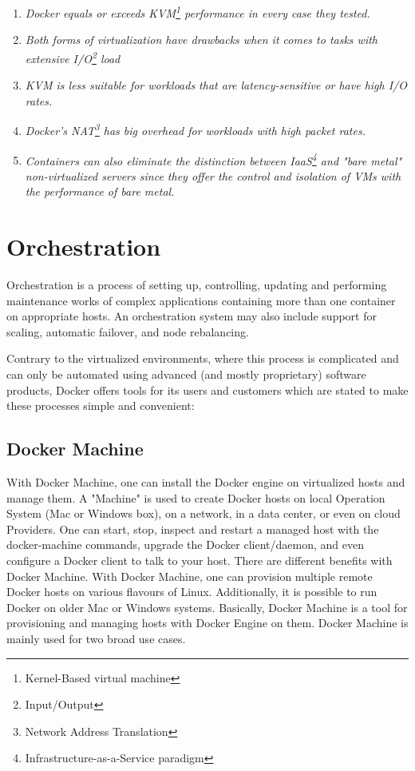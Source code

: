 \begin{enumerate}
\item \textit{Docker equals or
exceeds KVM\footnote{Kernel-Based virtual machine}
performance in every case they tested.}
\item \textit{Both forms of virtualization have drawbacks
when it comes to tasks with
extensive I/O\footnote{Input/Output} load}
\item \textit{KVM is less suitable for workloads that are latency-sensitive
or have high I/O rates.}
\item \textit{Docker's NAT\footnote{Network Address Translation}
has big overhead
for workloads with high packet rates.}
\item \textit{Containers can also eliminate the distinction between
IaaS\footnote{Infrastructure-as-a-Service paradigm}
and "bare metal" non-virtualized servers since
they offer the control and isolation of VMs
with the performance of bare metal.}
\end{enumerate}

\section{Orchestration}

\begin{definition}
Orchestration is a process of setting up, controlling, updating
and performing maintenance works of complex applications containing more than
one container on appropriate hosts. An orchestration system may also include support for scaling,
automatic failover, and node rebalancing\cite{AdrMouOrchestration:2016}.
\end{definition}

Contrary to the virtualized environments, where this
process is complicated and can only be automated using advanced (and mostly
proprietary) software products, Docker offers tools for its users and customers
which are stated to make these processes simple and convenient:

\subsection{Docker Machine}

With Docker Machine, one can install the Docker engine on virtualized
hosts and manage them. A "Machine" is used to create Docker
hosts on local Operation System (Mac or Windows box), on a
network, in a data center, or even on cloud Providers.
One can start, stop, inspect and restart a managed host
with the docker-machine commands, upgrade the Docker client/daemon, and
even configure a Docker client to talk to your host. There are different
benefits with Docker Machine. With Docker Machine, one can provision
multiple remote Docker hosts on various flavours of Linux.
Additionally, it is possible to run Docker on older Mac or Windows systems.
Basically, Docker Machine is a tool for provisioning and
managing hosts with Docker Engine on them\cite{DockerMachine}.
Docker Machine is mainly used for two broad use cases.


